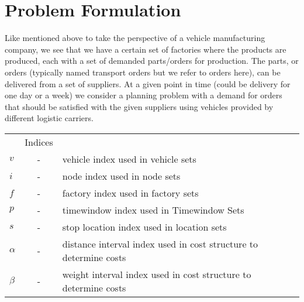 \documentclass[a4paper,10pt]{article}
\begin{document}
\section{Problem Formulation} \label{sec:PForm}
Like mentioned above to take the perspective of a vehicle manufacturing company, we see that we have a certain set of factories where the products are produced, each with a set of demanded parts/orders for production.
The parts, or orders (typically named transport orders but we refer to orders here), can be delivered from a set of suppliers.
At a given point in time (could be delivery for one day or a week) we consider a planning problem with a demand for orders that should be satisfied with the given suppliers using vehicles provided by different logistic carriers.
\linebreak


\begin{tabular}{l c l }
              &Indices          			        	\\ 
    $v      $ &-& vehicle index used in vehicle sets                    \\
    $i      $ &-& node index used in node sets                          \\
    $f      $ &-& factory index used in factory sets                    \\
    $p      $ &-& timewindow index used in Timewindow Sets              \\
    $s      $ &-& stop location index used in location sets             \\
    $\alpha $ &-& distance interval index used in cost structure to 
                    determine costs                                     \\
    $\beta  $ &-& weight interval index used in cost structure to 
                    determine costs                                     \\
\end{tabular}
\linebreak
\linebreak
\par
\end{document}
